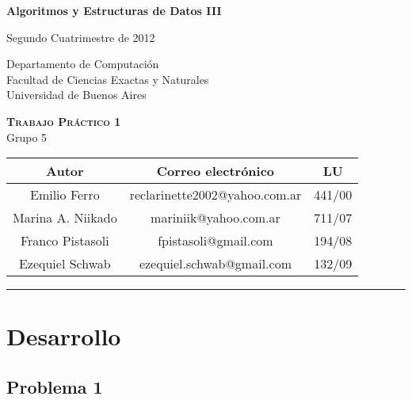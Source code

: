 \documentclass[12pt, a4paper,english,spanish]{article}
\begin{document}
\renewcommand{\refname}{} 

\begin{center}
\large{\textbf{Algoritmos y Estructuras de Datos III}}

\normalsize{Segundo Cuatrimestre de 2012}

\vspace{2mm}

Departamento de Computaci\'on\\
Facultad de Ciencias Exactas y Naturales\\
Universidad de Buenos Aires\\

\vspace{10mm}

\LARGE{\textsc{\textbf{Trabajo Pr\'actico 1}}} \\

\LARGE{Grupo 5}

\vspace{10mm}

\normalsize

\begin{tabular}{c|c|c}
\hline
\textbf{Autor} & \textbf{Correo electr\'onico} & \textbf{LU}\\
\hline
Emilio Ferro & reclarinette2002@yahoo.com.ar& 441$/$00\\    
Marina A. Niikado & mariniik@yahoo.com.ar & 711$/$07\\
Franco Pistasoli & fpistasoli@gmail.com & 194$/$08\\
Ezequiel Schwab & ezequiel.schwab@gmail.com & 132$/$09\\
\hline
\end{tabular}

\end{center}

\vskip 12pt
\rule{\textwidth}{1.2pt}
\vskip 5pt


\newpage

\tableofcontents



\newpage


\section{Desarrollo}  


\subsection*{Problema 1}
\end{document}
